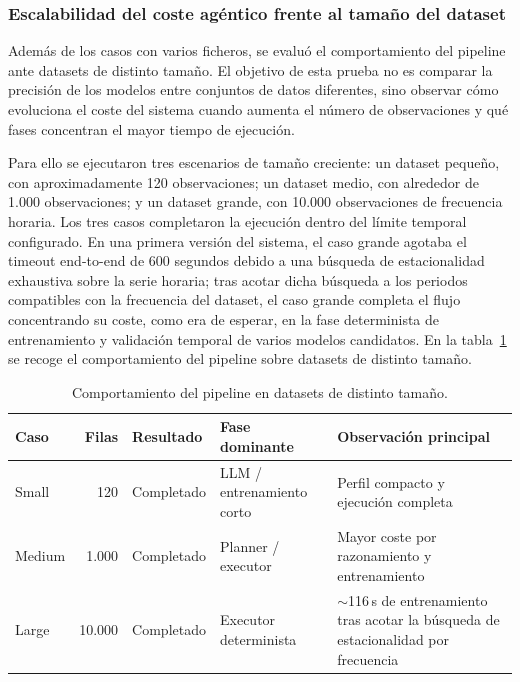 \documentclass[12pt,a4paper]{article}
\theoremstyle{plain}
\begin{document}
\subsubsection{Escalabilidad del coste agéntico frente al tamaño del dataset}
\label{sec:coste-tamano-dataset}

Además de los casos con varios ficheros, se evaluó el comportamiento del pipeline ante
datasets de distinto tamaño. El objetivo de esta prueba no es comparar la precisión de los
modelos entre conjuntos de datos diferentes, sino observar cómo evoluciona el coste del
sistema cuando aumenta el número de observaciones y qué fases concentran el mayor tiempo de
ejecución.

Para ello se ejecutaron tres escenarios de tamaño creciente: un dataset pequeño, con
aproximadamente 120 observaciones; un dataset medio, con alrededor de 1.000 observaciones; y
un dataset grande, con 10.000 observaciones de frecuencia horaria. Los tres casos completaron
la ejecución dentro del límite temporal configurado. En una primera versión del sistema, el
caso grande agotaba el timeout end-to-end de 600 segundos debido a una búsqueda de
estacionalidad exhaustiva sobre la serie horaria; tras acotar dicha búsqueda a los periodos
compatibles con la frecuencia del dataset, el caso grande completa el flujo concentrando su
coste, como era de esperar, en la fase determinista de entrenamiento y validación temporal de
varios modelos candidatos. En la tabla~\ref{tab:validacion-tamano} se recoge el comportamiento del pipeline sobre datasets de distinto tamaño. %

\begin{table}[H]
\centering
\footnotesize
\setlength{\tabcolsep}{4pt}
\renewcommand{\arraystretch}{1.05}
\begin{tabularx}{\linewidth}{l r l >{\RaggedRight\arraybackslash}X >{\RaggedRight\arraybackslash}X}
\hline
\textbf{Caso} & \textbf{Filas} & \textbf{Resultado} & \textbf{Fase dominante} & \textbf{Observación principal} \\\hline
Small & 120 & Completado & LLM / entrenamiento corto & Perfil compacto y ejecución completa \\\hline
Medium & 1.000 & Completado & Planner / executor & Mayor coste por razonamiento y entrenamiento \\\hline
Large & 10.000 & Completado & Executor determinista & $\sim$116\,s de entrenamiento tras acotar la búsqueda de estacionalidad por frecuencia \\\hline
\end{tabularx}
\caption{Comportamiento del pipeline en datasets de distinto tamaño.}
\label{tab:validacion-tamano}
\end{table}
\end{document}

